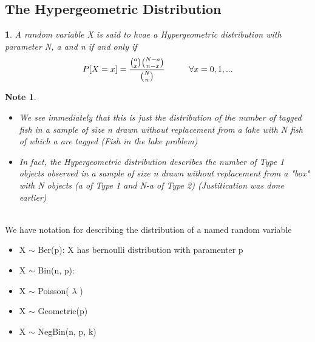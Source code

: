 \documentclass[11pt]{article}
\newtheorem*{note}{Note}
\newtheorem{definition}{\framebox{DEF}}[section]
\newcommand\tab[1][1cm]{\hspace*{#1}}
\begin{document}
        \subsection{The Hypergeometric Distribution} 
            \begin{definition}
                A random variable X is said to hvae a Hypergeometric distribution with parameter N, a and n
                if and only if \[P[X = x] = \frac{\binom{a}{x}\binom{N-a}{n-x}}{\binom{N}{n}} \tab \forall x = 0, 1,...\]
            \end{definition}
            \begin{note}\tab
                \begin{itemize}
                    \item We see immediately that this is just the distribution of the number of tagged fish in a sample of size n 
                            drawn without replacement from a lake with N fish of which a are tagged (Fish in the lake problem) 
                    \item In fact, the Hypergeometric distribution describes the number of Type 1 objects observed in a sample of size n drawn without replacement from a "box" with N objects 
                            (a of Type 1 and N-a of Type 2) (Justitication was done earlier)
                \end{itemize}
            \end{note}
            \tab \\
            \textbf{} We have notation for describing the distribution of a named random variable 
                \begin{itemize}
                    \item X $\sim$ Ber(p): X has bernoulli distribution with paramenter p 
                    \item X $\sim$ Bin(n, p): 
                    \item X $\sim$ Poisson( $\lambda$ )
                    \item X $\sim$ Geometric(p)
                    \item X $\sim$ NegBin(n, p, k)
                \end{itemize}
           
\end{document}
